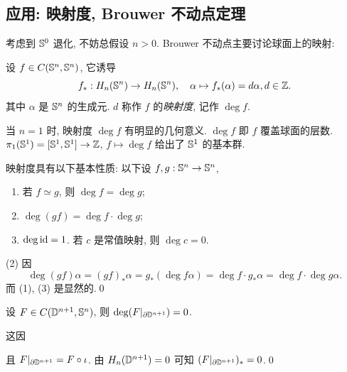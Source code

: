 \subsection{应用: 映射度, Brouwer 不动点定理}

考虑到 $ \S^0 $ 退化, 不妨总假设 $ n>0 $. Brouwer 不动点主要讨论球面上的映射:

\begin{Definition}[映射度]
	设 $ f\in C(\S^n,\S^n) $, 它诱导
	\[
		f_* : H_n(\S^n)\to H_n(\S^n),\quad \alpha\mapsto f_*(\alpha)=d\alpha, d\in\Z.
	\]
	其中 $ \alpha $ 是 $ \S^n $ 的生成元. $ d $ 称作 $ f $ 的\emph{映射度}, 记作 $ \deg f $.
\end{Definition}

当 $ n=1 $ 时, 映射度 $ \deg f $ 有明显的几何意义. $ \deg f $ 即 $ f $ 覆盖球面的层数. $ \pi_1(\S^1)=[\S^1,\S^1]\to\Z $, $ f\mapsto\deg f $ 给出了 $ \S^1 $ 的基本群.

\begin{Proposition}\label{prop:映射度的基本性质}
	映射度具有以下基本性质: 以下设 $ f,g : \S^n\to\S^n $,
	\begin{enumerate}
		\item 若 $ f\simeq g $, 则 $ \deg f=\deg g $;
		\item $ \deg(gf)=\deg f\cdot\deg g $;
		\item $ \deg\id=1 $. 若 $ c $ 是常值映射, 则 $ \deg c=0 $.
	\end{enumerate}
\end{Proposition}
\begin{Proof}
	(2) 因
	\[
		\deg(gf)\alpha=(gf)_*\alpha=g_*(\deg f\alpha)=\deg f\cdot g_*\alpha=\deg f\cdot\deg g\alpha.
	\]
	而 (1), (3) 是显然的.\qed
\end{Proof}

\begin{Lemma}\label{lem:边缘限制映射度为0}
	设 $ F\in C(\D^{n+1},\S^n) $, 则 $ \deg(F|_{\partial\D^{n+1}})=0 $.
\end{Lemma}
\begin{Proof}
	这因
	\begin{center}
	\end{center}
	且 $ F|_{\partial\D^{n+1}}=F\circ\iota $. 由 $ H_n(\D^{n+1})=0 $ 可知 $ (F|_{\partial\D^{n+1}})_*=0 $.\qed
\end{Proof}

